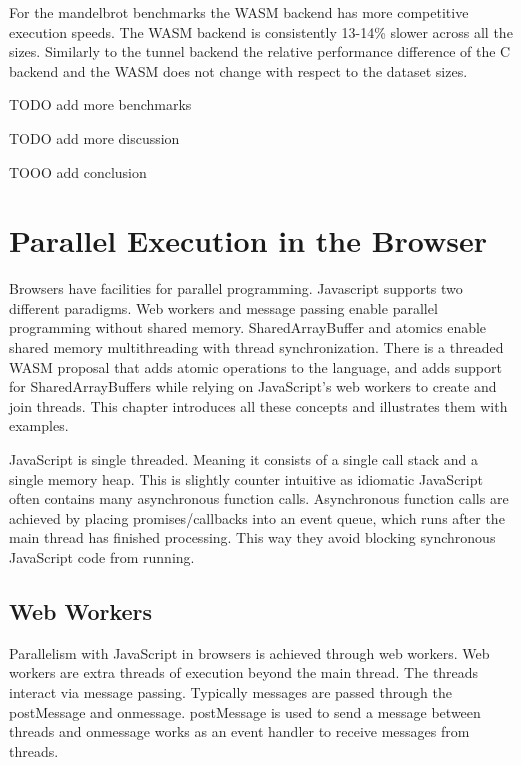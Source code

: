 \documentclass[11pt]{book}
\begin{document}
For the mandelbrot benchmarks the WASM backend has more competitive execution speeds. The WASM backend is consistently 13-14\% slower across all the sizes. Similarly to the tunnel backend the relative performance difference of the C backend and the WASM does not change with respect to the dataset sizes.


TODO add more benchmarks

TODO add more discussion

TOOO add conclusion
\chapter{Parallel Execution in the Browser}


Browsers have facilities for parallel programming. Javascript supports two different paradigms. Web workers and message passing enable parallel programming without shared memory. SharedArrayBuffer and atomics enable shared memory multithreading with thread synchronization. There is a threaded WASM proposal that adds atomic operations to the language, and adds support for SharedArrayBuffers while relying on JavaScript's web workers to create and join threads. This chapter introduces all these concepts and illustrates them with examples.

JavaScript is single threaded. Meaning it consists of a single call stack and a single memory heap. This is slightly counter intuitive as idiomatic JavaScript often contains many asynchronous function calls. Asynchronous function calls are achieved by placing promises/callbacks into an event queue, which runs after the main thread has finished processing. This way they avoid blocking synchronous JavaScript code from running. 



\section{Web Workers}
Parallelism with JavaScript in browsers is achieved through web workers. Web workers are extra threads of execution beyond the main thread. The threads interact via message passing. Typically messages are passed through the postMessage and onmessage. postMessage is used to send a message between threads and onmessage works as an event handler to receive messages from threads. 
\end{document}
